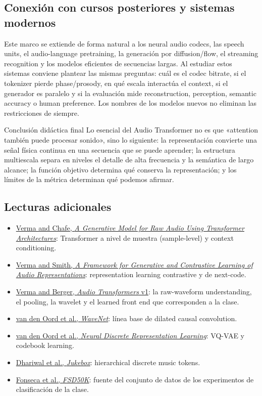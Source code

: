 \documentclass[a4paper]{article}
\begin{document}
\subsection{Conexión con cursos posteriores y sistemas modernos}

Este marco se extiende de forma natural a los neural audio codecs, las speech units, el audio-language pretraining, la generación por diffusion/flow, el streaming recognition y los modelos eficientes de secuencias largas. Al estudiar estos sistemas conviene plantear las mismas preguntas: cuál es el codec bitrate, si el tokenizer pierde phase/prosody, en qué escala interactúa el context, si el generador es paralelo y si la evaluación mide reconstruction, perception, semantic accuracy o human preference. Los nombres de los modelos nuevos no eliminan las restricciones de siempre.

\begin{importantbox}{Conclusión didáctica final}
Lo esencial del Audio Transformer no es que «attention también puede procesar sonido», sino lo siguiente: la representación convierte una señal física continua en una secuencia que se puede aprender; la estructura multiescala separa en niveles el detalle de alta frecuencia y la semántica de largo alcance; la función objetivo determina qué conserva la representación; y los límites de la métrica determinan qué podemos afirmar.
\end{importantbox}

\subsection{Lecturas adicionales}

\begin{itemize}
  \item \href{https://arxiv.org/abs/2106.16036}{Verma and Chafe, \emph{A Generative Model for Raw Audio Using Transformer Architectures}}: Transformer a nivel de muestra (sample-level) y context conditioning.
  \item \href{https://arxiv.org/abs/2010.11459}{Verma and Smith, \emph{A Framework for Generative and Contrastive Learning of Audio Representations}}: representation learning contrastive y de next-code.
  \item \href{https://arxiv.org/abs/2105.00335v1}{Verma and Berger, \emph{Audio Transformers} v1}: la raw-waveform understanding, el pooling, la wavelet y el learned front end que corresponden a la clase.
  \item \href{https://arxiv.org/abs/1609.03499}{van den Oord et al., \emph{WaveNet}}: línea base de dilated causal convolution.
  \item \href{https://arxiv.org/abs/1711.00937}{van den Oord et al., \emph{Neural Discrete Representation Learning}}: VQ-VAE y codebook learning.
  \item \href{https://arxiv.org/abs/2005.00341}{Dhariwal et al., \emph{Jukebox}}: hierarchical discrete music tokens.
  \item \href{https://arxiv.org/abs/2010.00475}{Fonseca et al., \emph{FSD50K}}: fuente del conjunto de datos de los experimentos de clasificación de la clase.
\end{itemize}
\end{document}
